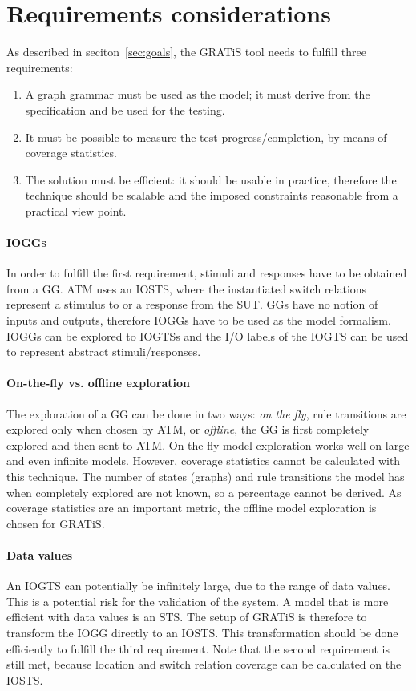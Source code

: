 \section{Requirements considerations}
As described in seciton~\ref{sec:goals}, the GRATiS tool needs to fulfill three requirements:
\begin{enumerate}
\item A graph grammar must be used as the model; it must derive from the specification and be used for the testing.
\item It must be possible to measure the test progress/completion, by means of coverage statistics.
\item The solution must be efficient: it should be usable in practice, therefore the technique should be scalable and the imposed constraints reasonable from a practical view point.
\end{enumerate}

\paragraph*{IOGGs} In order to fulfill the first requirement, stimuli and responses have to be obtained from a GG. ATM uses an IOSTS, where the instantiated switch relations represent a stimulus to or a response from the SUT. GGs have no notion of inputs and outputs, therefore IOGGs have to be used as the model formalism. IOGGs can be explored to IOGTSs and the I/O labels of the IOGTS can be used to represent abstract stimuli/responses.

\paragraph*{On-the-fly vs. offline exploration} The exploration of a GG can be done in two ways: \textit{on the fly}, rule transitions are explored only when chosen by ATM, or \textit{offline}, the GG is first completely explored and then sent to ATM. On-the-fly model exploration works well on large and even infinite models. However, coverage statistics cannot be calculated with this technique. The number of states (graphs) and rule transitions the model has when completely explored are not known, so a percentage cannot be derived. As coverage statistics are an important metric, the offline model exploration is chosen for GRATiS.

\paragraph*{Data values} An IOGTS can potentially be infinitely large, due to the range of data values. This is a potential risk for the validation of the system. A model that is more efficient with data values is an STS. The setup of GRATiS is therefore to transform the IOGG directly to an IOSTS. This transformation should be done efficiently to fulfill the third requirement. Note that the second requirement is still met, because location and switch relation coverage can be calculated on the IOSTS.

